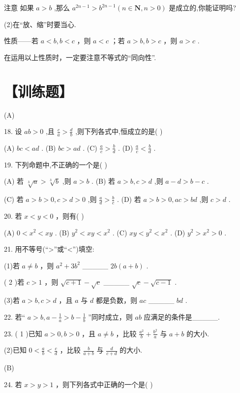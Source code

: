 \documentclass[10pt]{article}
\begin{document}
注意 如果 \(a > b\) ,那么 \({a}^{{2n} - 1} > {b}^{{2n} - 1}\left( {n \in  \mathbf{N},n > 0}\right)\) 是成立的,你能证明吗?

(2)在“放、缩”时要当心.

性质——若 \(a < b,b < c\) ，则 \(a < c\) ；若 \(a > b,b > c\) ，则 \(a > c\) .

在运用以上性质时，一定要注意不等式的“同向性”.

\section*{【训练题】}

(A)

18. 设 \({ab} > 0\) ,且 \(\frac{c}{a} > \frac{d}{b}\) ,则下列各式中,恒成立的是( )

(A) \({bc} < {ad}\) . (B) \({bc} > {ad}\) . (C) \(\frac{a}{c} > \frac{b}{d}\) . (D) \(\frac{a}{c} < \frac{b}{d}\) .

19. 下列命题中,不正确的一个是( )

(A) 若 \(\sqrt[3]{a} > \sqrt[3]{b}\) ,则 \(a > b\) . (B) 若 \(a > b,c > d\) ,则 \(a - d > b - c\) .

(C) 若 \(a > b > 0,c > d > 0\) ,则 \(\frac{a}{d} > \frac{b}{c}\) . (D) 若 \(a > b > 0,{ac} > {bd}\) ,则 \(c > d\) .

20. 若 \(x < y < 0\) ，则有( )

(A) \(0 < {x}^{2} < {xy}\) . (B) \({y}^{2} < {xy} < {x}^{2}\) . (C) \({xy} < {y}^{2} < {x}^{2}\) . (D) \({y}^{2} > {x}^{2} > 0\) .

21. 用不等号(“>”或“<”)填空:

(1)若 \(a \neq  b\) ，则 \({a}^{2} + 3{b}^{2}\) \_\_\_\_\_ \({2b}\left( {a + b}\right)\) .

( 2 )若 \(c > 1\) ，则 \(\sqrt{c + 1} - \sqrt{c}\) \_\_\_\_\_ \(\sqrt{c} - \sqrt{c - 1}\) .

(3)若 \(a > b,c > d\) ，且 \(a\) 与 \(d\) 都是负数，则 \({ac}\) \_\_\_\_\_ \({bd}\) .

22. 若“ \(a > b,a - \frac{1}{a} > b - \frac{1}{b}\) ”同时成立，则 \({ab}\) 应满足的条件是\_\_\_\_\_.

23. ( 1 )已知 \(a > 0,b > 0\) ，且 \(a \neq  b\) ，比较 \(\frac{{a}^{2}}{b} + \frac{{b}^{2}}{a}\) 与 \(a + b\) 的大小.

(2)已知 \(0 < \frac{a}{b} < \frac{c}{d}\) ，比较 \(\frac{b}{a + b}\) 与 \(\frac{d}{c + d}\) 的大小.

(B)

24. 若 \(x > y > 1\) ，则下列各式中正确的一个是( )
\end{document}
